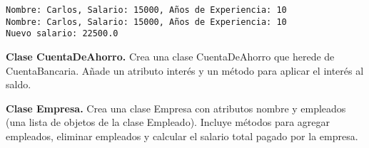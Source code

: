 \begin{exercise}
{\begin{verbatim}
Nombre: Carlos, Salario: 15000, Años de Experiencia: 10
Nombre: Carlos, Salario: 15000, Años de Experiencia: 10
Nuevo salario: 22500.0

\end{verbatim}
}\end{exercise}


\begin{exercise}{\rm \textbf{Clase CuentaDeAhorro.}
Crea una clase CuentaDeAhorro que herede de CuentaBancaria. Añade un
atributo interés y un método para aplicar el interés al saldo.

\begin{Shaded}
\begin{Highlighting}[]

\end{Highlighting}
\end{Shaded}
}\end{exercise}

\begin{exercise}{\rm \textbf{Clase Empresa.}
Crea una clase Empresa con atributos nombre y empleados (una lista de
objetos de la clase Empleado). Incluye métodos para agregar empleados,
eliminar empleados y calcular el salario total pagado por la empresa.

\begin{Shaded}
\begin{Highlighting}[]

\end{Highlighting}
\end{Shaded}
}\end{exercise}
